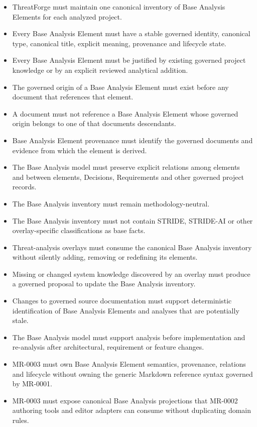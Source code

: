 \documentclass[
  10pt,
]{article}
\providecommand{\tightlist}{%
  \setlength{\itemsep}{0pt}\setlength{\parskip}{0pt}}
\begin{document}
\begin{itemize}
\tightlist
\item
  ThreatForge must maintain one canonical inventory of Base Analysis
  Elements for each analyzed project.
\item
  Every Base Analysis Element must have a stable governed identity,
  canonical type, canonical title, explicit meaning, provenance and
  lifecycle state.
\item
  Every Base Analysis Element must be justified by existing governed
  project knowledge or by an explicit reviewed analytical addition.
\item
  The governed origin of a Base Analysis Element must exist before any
  document that references that element.
\item
  A document must not reference a Base Analysis Element whose governed
  origin belongs to one of that document\textquotesingle s descendants.
\item
  Base Analysis Element provenance must identify the governed documents
  and evidence from which the element is derived.
\item
  The Base Analysis model must preserve explicit relations among
  elements and between elements, Decisions, Requirements and other
  governed project records.
\item
  The Base Analysis inventory must remain methodology-neutral.
\item
  The Base Analysis inventory must not contain STRIDE, STRIDE-AI or
  other overlay-specific classifications as base facts.
\item
  Threat-analysis overlays must consume the canonical Base Analysis
  inventory without silently adding, removing or redefining its
  elements.
\item
  Missing or changed system knowledge discovered by an overlay must
  produce a governed proposal to update the Base Analysis inventory.
\item
  Changes to governed source documentation must support deterministic
  identification of Base Analysis Elements and analyses that are
  potentially stale.
\item
  The Base Analysis model must support analysis before implementation
  and re-analysis after architectural, requirement or feature changes.
\item
  MR-0003 must own Base Analysis Element semantics, provenance,
  relations and lifecycle without owning the generic Markdown reference
  syntax governed by MR-0001.
\item
  MR-0003 must expose canonical Base Analysis projections that MR-0002
  authoring tools and editor adapters can consume without duplicating
  domain rules.
\end{itemize}
\end{document}
